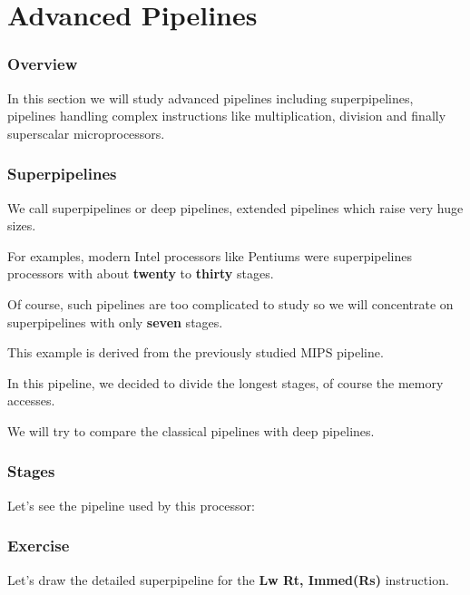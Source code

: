 %
%

\section{Advanced Pipelines}


\begin{frame}
  \frametitle{Overview}

  In this section we will study advanced pipelines including superpipelines,
  pipelines handling complex instructions like multiplication, division
  and finally superscalar microprocessors.
\end{frame}


\begin{frame}
  \frametitle{Superpipelines}

  We call superpipelines or deep pipelines, extended pipelines which
  raise very huge sizes.

  \-

  For examples, modern Intel processors like Pentiums were superpipelines
  processors with about \textbf{twenty} to \textbf{thirty} stages.

  \-

  Of course, such pipelines are too complicated to study so we will concentrate
  on superpipelines with only \textbf{seven} stages.

  \-

  This example is derived from the previously studied MIPS pipeline.

  \-

  In this pipeline, we decided to divide the longest stages, of course
  the memory accesses.

  \-

  We will try to compare the classical pipelines with deep pipelines.
\end{frame}


\begin{frame}
  \frametitle{Stages}

  Let's see the pipeline used by this processor:

  \begin{center}
  \end{center}
\end{frame}


\begin{frame}
  \frametitle{Exercise}

  Let's draw the detailed superpipeline for the \textbf{Lw Rt, Immed(Rs)}
  instruction.
\end{frame}

